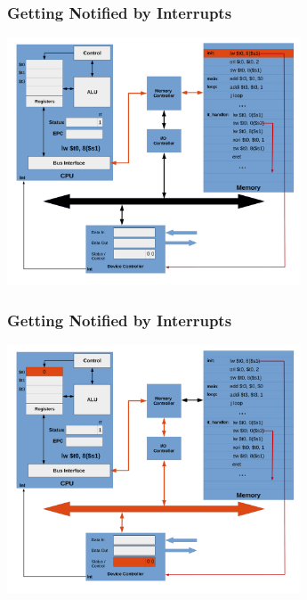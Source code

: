 \documentclass{beamer}
\begin{document}
\begin{frame}[fragile]
\frametitle{Getting Notified by Interrupts}

\begin{center}
\vspace*{-0.23cm}
\hspace*{-1cm}\includegraphics[width=8.7cm]{interrupt_waiting2.pdf}
\end{center}

\end{frame}

\begin{frame}[fragile]
\frametitle{Getting Notified by Interrupts}

\begin{center}
\vspace*{-0.23cm}
\hspace*{-1cm}\includegraphics[width=8.7cm]{interrupt_waiting3.pdf}
\end{center}

\end{frame}
\end{document}
